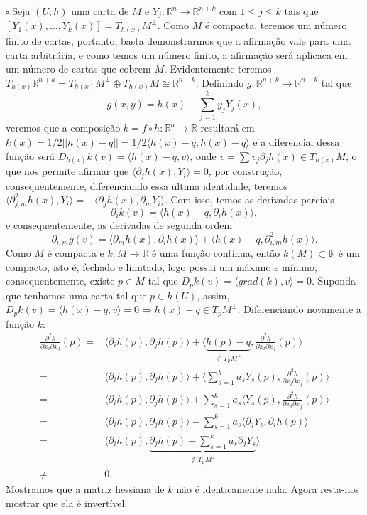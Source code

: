 \documentclass{article}
\begin{document}
	$\square$ Seja $(U,h)$ uma carta de $M$ e $Y_{j}:\mathbb{R}^{n} \to \mathbb{R}^{n+k}$ com $1 \leq j \leq k$ tais que $[Y_{1}(x), \dots, Y_{k}(x)] = T_{h(x)}M^{\perp}$. Como $M$ é compacta, teremos um número finito de cartas, portanto, basta demonstrarmos que a afirmação vale para uma carta arbitrária, e como temos um número finito, a afirmação será aplicaca em um número de cartas que cobrem $M$. Evidentemente teremos $T_{h(x)}\mathbb{R}^{n+k} = T_{h(x)}M^{\perp} \oplus T_{h(x)}M \cong \mathbb{R}^{n+k}$. Definindo $g:\mathbb{R}^{n+k} \to \mathbb{R}^{n+k}$ tal que
	$$
	g(x, y) = h(x) + \sum_{j=1}^{k} y_{j}Y_{j}(x),
	$$
	veremos que a composição $k = f \circ h : \mathbb{R}^{n} \to \mathbb{R}$ resultará em $k(x) =1/2||h(x) - q|| = 1/2 \langle h(x) - q,h(x) - q \rangle $ e a diferencial dessa função será $D_{h(x)}k(v) = \langle h(x) - q, v\rangle$, onde $v = \sum v_{j}\partial_{j}h(x) \in T_{h(x)}M$, o que nos permite afirmar que $ \langle \partial_{j}h(x), Y_{i} \rangle = 0$, por construção, consequentemente, diferenciando essa ultima identidade, teremos $\langle \partial^{2}_{j,m}h(x), Y_{i} \rangle = -\langle \partial_{j}h(x), \partial_{m}Y_{i} \rangle$. Com isso, temos as derivadas parciais
	$$
	\partial_{i}k(v) = \langle h(x) - q, \partial_{i}h(x) \rangle,
	$$
	e consequentemente, as derivadas de segunda ordem
	$$
	\partial_{i,m}g(v) = \langle \partial_{m}h(x), \partial_{i}h(x) \rangle + \langle h(x) - q, \partial^{2}_{i,m}h(x) \rangle.
	$$
	Como $M$ é compacta e $k: M \to \mathbb{R}$ é uma função contínua, então $k(M) \subset \mathbb{R}$ é um compacto, isto é, fechado e limitado, logo possui um máximo e mínimo, consequentemente, existe $p \in M$ tal que $D_{p}k(v) = \langle grad(k), v \rangle = 0$. Suponda que tenhamos uma carta tal que $p \in h(U)$, assim, $D_{p}k(v) = \langle h(x) - q, v \rangle = 0 \Rightarrow h(x) - q \in T_{p}M^{\perp}$. Diferenciando novamente a função $k$:
	$$
	\begin{aligned}
	\frac{\partial^{2}k}{\partial x_{i}\partial x_{j}}(p) =& \langle \partial_{i}h(p), \partial_{j}h(p) \rangle + \langle \underbrace{ h(p) - q }_{\in T_{p}M^{\perp}}, \frac{\partial^{2} h}{\partial x_{i}\partial x_{j}}(p)\rangle
	\\
	=& \langle \partial_{i}h(p), \partial_{j}h(p) \rangle + \langle \sum_{s=1}^{k}a_{s}Y_{s}(p), \frac{\partial^{2} h}{\partial x_{i}\partial x_{j}}(p)\rangle
	\\
	=& \langle \partial_{i}h(p), \partial_{j}h(p) \rangle + \sum_{s=1}^{k}a_{s} \langle Y_{s}(p), \frac{\partial^{2} h}{\partial x_{i}\partial x_{j}}(p)\rangle
	\\
	=& \langle \partial_{i}h(p), \partial_{j}h(p) \rangle - \sum_{s=1}^{k}a_{s} \langle \partial_{j}Y_{s} , \partial_{i}h(p)\rangle
	\\
	=& \langle \partial_{i}h(p), \underbrace{ \partial_{j}h(p) - \sum_{s=1}^{k}a_{s} \partial_{j}Y_{s} }_{\notin T_{p}M^{\perp}} \rangle
	\\
	\neq & 0.
	\end{aligned}
	$$
	Mostramos que a matriz hessiana de $k$ não é identicamente nula. Agora resta-nos mostrar que ela é invertível.
	
\end{document}
